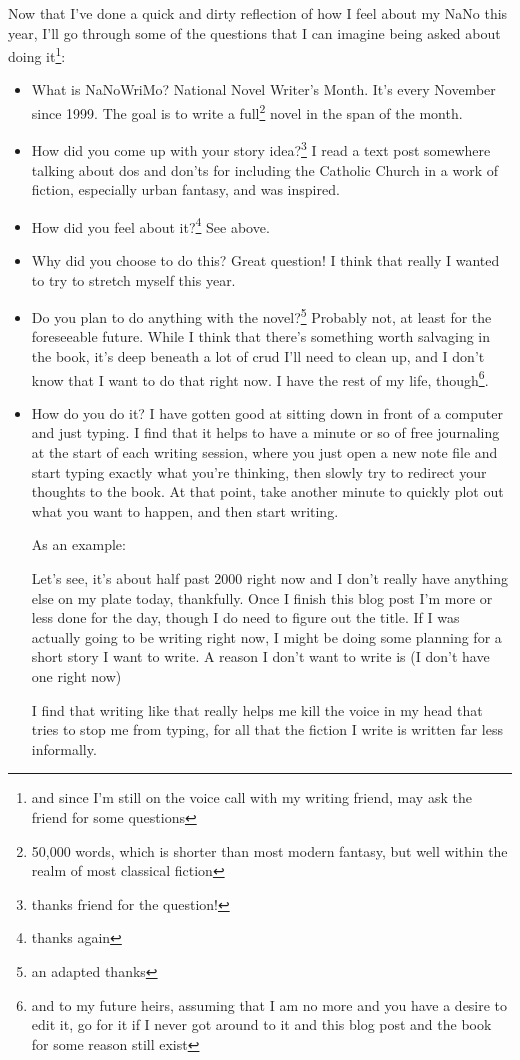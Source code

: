 \documentclass[12pt]{article}[titlepage]
\newcommand{\1}{\={a}}
\newcommand{\2}{\={e}}
\newcommand{\3}{\={\i}}
\newcommand{\4}{\=o}
\newcommand{\5}{\=u}
\newcommand{\6}{\={A}}
\renewcommand{\,}{\textsuperscript{,}}
\begin{document}
Now that I've done a quick and dirty reflection of how I feel about my NaNo this year, I'll go through some of the questions that I can imagine being asked about doing it\footnote{and since I'm still on the voice call with my writing friend, may ask the friend for some questions}:
\begin{itemize}
\item What is NaNoWriMo?
National Novel Writer's Month.
It's every November since 1999.
The goal is to write a full\footnote{50,000 words, which is shorter than most modern fantasy, but well within the realm of most classical fiction} novel in the span of the month. 
\item How did you come up with your story idea?\footnote{thanks friend for the question!}
I read a text post somewhere talking about dos and don'ts for including the Catholic Church in a work of fiction, especially urban fantasy, and was inspired.
\item How did you feel about it?\footnote{thanks again}
See above. 
\item Why did you choose to do this?
Great question! I think that really I wanted to try to stretch myself this year. 
\item Do you plan to do anything with the novel?\footnote{an adapted thanks}
Probably not, at least for the foreseeable future.
While I think that there's something worth salvaging in the book, it's deep beneath a lot of crud I'll need to clean up, and I don't know that I want to do that right now.
I have the rest of my life, though\footnote{and to my future heirs, assuming that I am no more and you have a desire to edit it, go for it if I never got around to it and this blog post and the book for some reason still exist}.
\item How do you do it?
I have gotten good at sitting down in front of a computer and just typing.
I find that it helps to have a minute or so of free journaling at the start of each writing session, where you just open a new note file and start typing exactly what you're thinking, then slowly try to redirect your thoughts to the book.
At that point, take another minute to quickly plot out what you want to happen, and then start writing.
 
As an example:
 
Let's see, it's about half past 2000 right now and I don't really have anything else on my plate today, thankfully.
Once I finish this blog post I'm more or less done for the day, though I do need to figure out the title.
If I was actually going to be writing right now, I might be doing some planning for a short story I want to write.
A reason I don't want to write is (I don't have one right now)
 
I find that writing like that really helps me kill the voice in my head that tries to stop me from typing, for all that the fiction I write is written far less informally.
\end{itemize}
 
\end{document}
